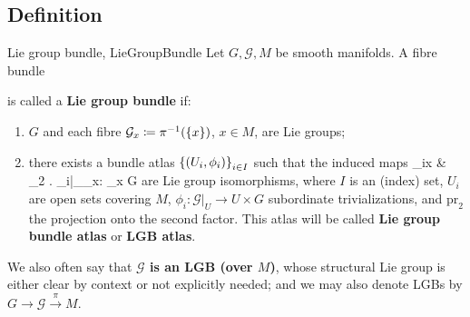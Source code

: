 \documentclass[a4paper,oneside,11pt,bibliography=totoc]{scrartcl}
\def\bas#1\eas{\begin{align*}#1\end{align*}}
\theoremstyle{plain}
\theoremstyle{remark}
\theoremstyle{definition}
\begin{document}
\subsection{Definition}
\begin{definitions}{Lie group bundle, \cite[\S 1.1, Def.\ 1.1.19; p. 11]{mackenzieGeneralTheory}}{LieGroupBundle}
Let $G, \mathcal{G}, M$ be smooth manifolds. A fibre bundle
\begin{center}
\end{center}
is called a \textbf{Lie group bundle} if:
\begin{enumerate}
	\item $G$ and each fibre $\mathcal{G}_x \coloneqq \pi^{-1}\mleft( \{x\} \mright)$, $x\in M$, are Lie groups;
	\item there exists a bundle atlas $\mleft\{ \mleft( U_i, \phi_i \mright) \mright\}_{i \in I}$ such that the induced maps
	\bas
	\phi_{ix}
	&\coloneqq
	_2 \circ \mleft. \phi_i\mright|_{_x}: _x \to G
	\eas
	are Lie group isomorphisms, where $I$ is an (index) set, $U_i$ are open sets covering $M$, $\phi_i: \mathcal{G}|_U \to U \times G$ subordinate trivializations, and $\mathrm{pr}_2$ the projection onto the second factor. This atlas will be called \textbf{Lie group bundle atlas} or \textbf{LGB atlas}.
\end{enumerate}

We also often say that \textbf{$\mathcal{G}$ is an LGB (over $M$)}, whose structural Lie group is either clear by context or not explicitly needed; and we may also denote LGBs by $G \to \mathcal{G} \stackrel{\pi}{\to} M$.
\end{definitions}
\end{document}
